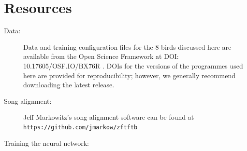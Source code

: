 \documentclass[10pt,letterpaper]{article}
\begin{document}
\appendix

\section{Resources}
\label{sec:resources}

\begin{description}
\item[Data:]
  Data and training configuration files for the 8 birds discussed here are available from the Open Science Framework at DOI: 10.17605/OSF.IO/BX76R . DOIs for the versions of the programmes used here are provided for reproducibility; however, we generally recommend downloading the latest release.
\item[Song alignment:] Jeff Markowitz's song alignment software \cite{Poole2012} can be found at
    {\tt https://github.com/jmarkow/zftftb}
\item[Training the neural network:]\hfill


\end{description}
\end{document}
